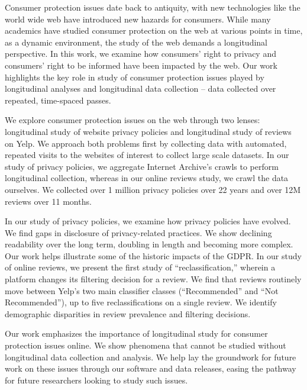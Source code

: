 
Consumer protection issues date back to antiquity, with new technologies like the world wide web have introduced new hazards for consumers. While many academics have studied consumer protection on the web at various points in time, as a dynamic environment, the study of the web demands a longitudinal perspective. In this work, we examine how consumers' right to privacy and consumers' right to be informed have been impacted by the web. Our work highlights the key role in study of consumer protection issues played by longitudinal analyses and longitudinal data collection -- data collected over repeated, time-spaced passes.

We explore consumer protection issues on the web through two lenses: longitudinal study of website privacy policies and longitudinal study of reviews on Yelp. We approach both problems first by collecting data with automated, repeated visits to the websites of interest to collect large scale datasets. In our study of privacy policies, we aggregate Internet Archive's crawls to perform longitudinal collection, whereas in our online reviews study, we crawl the data ourselves. We collected over 1 million privacy policies over 22 years and over 12M reviews over 11 months. 

In our study of privacy policies, we examine how privacy policies have evolved. We find gaps in disclosure of privacy-related practices. We show declining readability over the long term, doubling in length and becoming more complex. Our work helps illustrate some of the historic impacts of the GDPR. In our study of online reviews, we present the first study of ``reclassification,'' wherein a platform changes its filtering decision for a review. We find that reviews routinely move between Yelp's two main classifier classes (``Recommended'' and ``Not Recommended''), up to five reclassifications on a single review. We identify demographic disparities in review prevalence and filtering decisions.

Our work emphasizes the importance of longitudinal study for consumer protection issues online. We show phenomena that cannot be studied without longitudinal data collection and analysis. We help lay the groundwork for future work on these issues through our software and data releases, easing the pathway for future researchers looking to study such issues.


